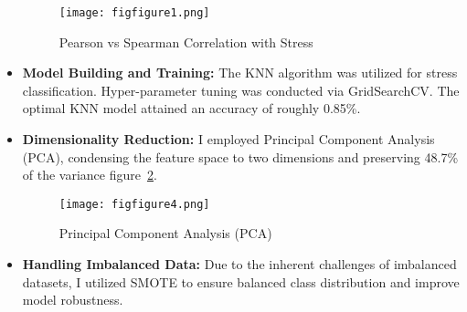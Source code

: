 \documentclass{article}
\begin{document}
\begin{itemize}
\begin{figure}[htbp]
    \centering
    \texttt{[image: figfigure1.png]}
    \caption{Pearson vs Spearman Correlation with Stress }
  \label{fig:figure1}
\end{figure}


\item \textbf{Model Building and Training:} The KNN algorithm was utilized for stress classification. Hyper-parameter tuning was conducted via GridSearchCV. The optimal KNN model attained an accuracy of roughly 0.85\%.

\item \textbf{Dimensionality Reduction:} I employed Principal Component Analysis (PCA), condensing the feature space to two dimensions and preserving 48.7\% of the variance figure~\ref{fig:figure4}.

\vspace{-0.1cm} %
\begin{figure}[!htbp]
    \centering
    \texttt{[image: figfigure4.png]}
    \caption{Principal Component Analysis (PCA)}
    \label{fig:figure4}
\end{figure}

\item \textbf{Handling Imbalanced Data:}  Due to the inherent challenges of imbalanced datasets, I utilized SMOTE to ensure balanced class distribution and improve model robustness.

\end{itemize}
\end{document}
